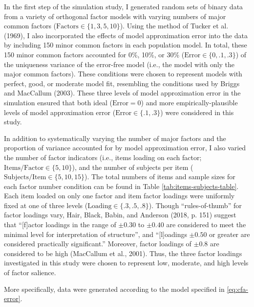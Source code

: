 \documentclass[
  english,
  man]{apa6}
\begin{document}
In the first step of the simulation study, I generated random sets of binary data from a variety of orthogonal factor models with varying numbers of major common factors (\(\textrm{Factors} \in \{1, 3, 5, 10 \}\)). Using the method of Tucker et al. (1969), I also incorporated the effects of model approximation error into the data by including 150 minor common factors in each population model. In total, these 150 minor common factors accounted for 0\%, 10\%, or 30\% (\(\textrm{Error} \in \{ 0, .1, .3 \}\)) of the uniqueness variance of the error-free model (i.e., the model with only the major common factors). These conditions were chosen to represent models with perfect, good, or moderate model fit, resembling the conditions used by Briggs and MacCallum (2003). These three levels of model approximation error in the simulation ensured that both ideal (\(\textrm{Error} = 0\)) and more empirically-plausible levels of model approximation error (\(\textrm{Error} \in \{ .1, .3\}\)) were considered in this study.

In addition to systematically varying the number of major factors and the proportion of variance accounted for by model approximation error, I also varied the number of factor indicators (i.e., items loading on each factor; \(\textrm{Items/Factor} \in \{5, 10 \}\)), and the number of subjects per item (\(\textrm{Subjects/Item} \in \{ 5, 10, 15\}\)). The total numbers of items and sample sizes for each factor number condition can be found in Table \ref{tab:items-subjects-table}. Each item loaded on only one factor and item factor loadings were uniformly fixed at one of three levels (\(\textrm{Loading} \in \{ .3, .5, .8 \}\)). Though \enquote{rules-of-thumb} for factor loadings vary, Hair, Black, Babin, and Anderson (2018, p. 151) suggest that \enquote{{[}f{]}actor loadings in the range of \(\pm 0.30\) to \(\pm 0.40\) are considered to meet the minimal level for interpretation of structure}, and \enquote{{[}l{]}oadings \(\pm 0.50\) or greater are considered practically significant.} Moreover, factor loadings of \(\pm 0.8\) are considered to be high (MacCallum et al., 2001). Thus, the three factor loadings investigated in this study were chosen to represent low, moderate, and high levels of factor salience.


More specifically, data were generated according to the model specified in \eqref{eq:cfa-error}.
\end{document}
